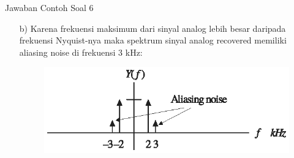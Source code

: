 \documentclass[pdflatex,compress,mathserif]{beamer}
\begin{document}
\begin{frame}{Jawaban Contoh Soal 6}
    \begin{enumerate}
        \item[b)] Karena frekuensi maksimum dari sinyal analog lebih besar daripada frekuensi Nyquist-nya maka spektrum sinyal analog recovered memiliki aliasing noise di frekuensi 3 kHz:
        \begin{figure}
            \includegraphics[width=\linewidth]{img/img21}
        \end{figure}
    \end{enumerate}
\end{frame}
\end{document}
